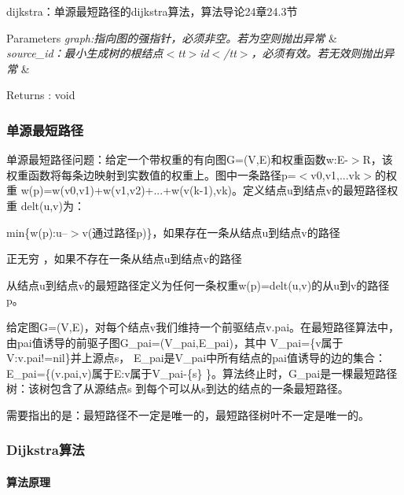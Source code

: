 dijkstra：单源最短路径的dijkstra算法，算法导论24章24.3节 


\begin{DoxyParams}{Parameters}
{\em graph\+:指向图的强指针，必须非空。若为空则抛出异常} & \\
\hline
{\em source\+\_\+id：最小生成树的根结点$<$tt$>$id$<$/tt$>$，必须有效。若无效则抛出异常} & \\
\hline
\end{DoxyParams}
\begin{DoxyReturn}{Returns}
\+: void
\end{DoxyReturn}
\subsubsection*{单源最短路径}

单源最短路径问题：给定一个带权重的有向图\+G=(V,E)和权重函数w\+:E-\/$>$R，该权重函数将每条边映射到实数值的权重上。图中一条路径p=$<$v0,v1,...vk$>$的权重 w(p)=w(v0,v1)+w(v1,v2)+...+w(v(k-\/1),vk)。定义结点u到结点v的最短路径权重 delt(u,v)为：


\begin{DoxyItemize}
\item min\{w(p)\+:u--$>$v(通过路径p)\}，如果存在一条从结点u到结点v的路径
\item 正无穷 ，如果不存在一条从结点u到结点v的路径
\end{DoxyItemize}

从结点u到结点v的最短路径定义为任何一条权重w(p)=delt(u,v)的从u到v的路径p。

给定图\+G=(V,E)，对每个结点v我们维持一个前驱结点v.\+pai。在最短路径算法中，由pai值诱导的前驱子图\+G\+\_\+pai=(V\+\_\+pai,E\+\_\+pai)，其中 V\+\_\+pai=\{v属于\+V\+:v.\+pai!=nil\}并上源点s， E\+\_\+pai是\+V\+\_\+pai中所有结点的pai值诱导的边的集合：\+E\+\_\+pai=\{(v.\+pai,v)属于\+E\+:v属于\+V\+\_\+pai-\/\{s\} \}。算法终止时，\+G\+\_\+pai是一棵最短路径树：该树包含了从源结点s 到每个可以从s到达的结点的一条最短路径。

需要指出的是：最短路径不一定是唯一的，最短路径树叶不一定是唯一的。

\subsubsection*{Dijkstra算法}

\paragraph*{算法原理}

